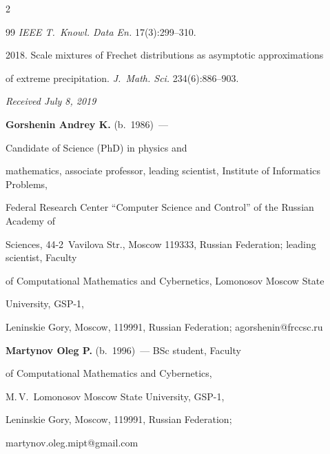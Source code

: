 \begin{multicols}{2}
{{\begin{thebibliography}{99}
\textit{IEEE T.~Knowl. Data En.} 17(3):299--310.





 2018. Scale mixtures of Frechet distributions as asymptotic approximations 

 of extreme precipitation. \textit{J.~Math. Sci.} 234(6):886--903.

\end{thebibliography}



 }

 }



\end{multicols}






\hfill{\small\textit{Received July 8, 2019}}









\Contr





\noindent

\textbf{Gorshenin Andrey K.} (b.\ 1986)~--- 

Candidate of Science (PhD) in physics and

mathematics, associate professor, leading scientist, Institute of Informatics Problems,

Federal Research Center ``Computer Science and Control'' of the Russian Academy of

Sciences, 44-2~Vavilova Str., Moscow 119333, Russian Federation;  leading scientist, Faculty

of Computational Mathematics and Cybernetics, Lomonosov Moscow State 

University, GSP-1,

Leninskie Gory, Moscow, 119991, Russian Federation; \mbox{agorshenin@frccsc.ru}



\vspace*{3pt}



\noindent

\textbf{Martynov Oleg P.} (b.\ 1996)~--- BSc student,  Faculty

of Computational Mathematics and Cybernetics, 

M.\,V.~Lomonosov Moscow State University, GSP-1,

Leninskie Gory, Moscow, 119991, Russian Federation; 

\mbox{martynov.oleg.mipt@gmail.com}

\label{end\stat}



\renewcommand{\bibname}{\protect\rm Литература}  


